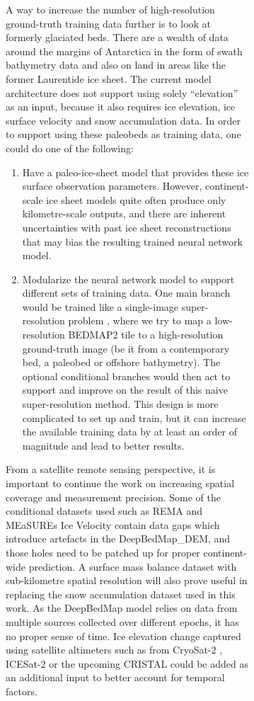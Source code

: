 \documentclass[tc, noline]{copernicus}
\begin{document}
\begin{figure}[t]
\begin{figure}[t]
A way to increase the number of high-resolution ground-truth training data further is to look at formerly glaciated beds.
There are a wealth of data around the margins of Antarctica in the form of swath bathymetry data and also on land in areas like the former Laurentide ice sheet.
The current model architecture does not support using solely ``elevation'' as an input, because it also requires ice elevation, ice surface velocity and snow accumulation data.
In order to support using these paleobeds as training data, one could do one of the following:

\begin{enumerate}
  \item Have a paleo-ice-sheet model that provides these ice surface observation parameters.
  However, continent-scale ice sheet models quite often produce only kilometre-scale outputs, and there are inherent uncertainties with past ice sheet reconstructions that may bias the resulting trained neural network model.

  \item Modularize the neural network model to support different sets of training data.
  One main branch would be trained like a single-image super-resolution problem \citep{YangDeepLearningSingle2019}, where we try to map a low-resolution BEDMAP2 tile to a high-resolution ground-truth image (be it from a contemporary bed, a paleobed or offshore bathymetry).
  The optional conditional branches would then act to support and improve on the result of this naive super-resolution method.
  This design is more complicated to set up and train, but it can increase the available training data by at least an order of magnitude and lead to better results.
\end{enumerate}

From a satellite remote sensing perspective, it is important to continue the work on increasing spatial coverage and measurement precision.
Some of the conditional datasets used such as REMA \citep{HowatReferenceElevationModel2019} and MEaSUREs Ice Velocity \citep{MouginotMEaSUREsPhaseMap2019} contain data gaps which introduce artefacts in the DeepBedMap\_DEM, and those holes need to be patched up for proper continent-wide prediction.
A surface mass balance dataset with sub-kilometre spatial resolution will also prove useful in replacing the snow accumulation dataset \citep{ArthernAntarcticsnowaccumulation2006} used in this work.
As the DeepBedMap model relies on data from multiple sources collected over different epochs, it has no proper sense of time.
Ice elevation change captured using satellite altimeters such as from CryoSat-2 \citep{HelmElevationelevationchange2014}, ICESat-2 \citep{MarkusIceCloudland2017} or the upcoming CRISTAL \citep{KernCopernicusPolarIce2020} could be added as an additional input to better account for temporal factors.


\end{figure}
\end{figure}
\end{document}
